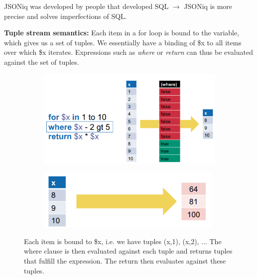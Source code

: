 \documentclass[11pt,oneside,a4paper]{article}
\begin{document}
{JSONiq was developed by people that developed SQL $\rightarrow$ JSONiq is more precise and solves imperfections of SQL.

\textbf{Tuple stream semantics:} Each item in a for loop is bound to the variable, which gives us a set of tuples. We essentially have a binding of \$x to all items over which \$x iterates. Expressions such as \textit{where} or \textit{return} can thus be evaluated against the set of tuples.

\begin{figure}[hb!]
	\centering
	\begin{subfigure}[t]{.5\textwidth}
		\centering
		\includegraphics[width=0.5\linewidth]{figures/queryingtrees_tuples_11}
	\end{subfigure}%
	\begin{subfigure}[t]{.5\textwidth}
		\centering
		\includegraphics[width=0.6\linewidth]{figures/queryingtrees_tuples_12}
	\end{subfigure}
	\caption{Each item is bound to \$x, i.e. we have tuples (x,1), (x,2), ... The where clause is then evaluated against each tuple and returns tuples that fulfill the expression. The return then evaluates against these tuples.}
\end{figure}

}
\end{document}
